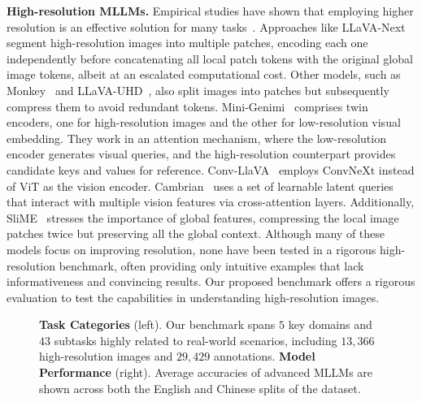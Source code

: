 \textbf{High-resolution MLLMs.} 
Empirical studies have shown that employing higher resolution is an effective solution for many tasks~\citep{bai2023qwen,liu2023improved,li2023monkey,mckinzie2024mm1}. Approaches like LLaVA-Next~\citep{liu2024llavanext} segment high-resolution images into multiple patches, encoding each one independently before concatenating all local patch tokens with the original global image tokens, albeit at an escalated computational cost. Other models, such as Monkey~\citep{li2023monkey} and LLaVA-UHD~\citep{xu2024llava-uhd}, also split images into patches but subsequently compress them to avoid redundant tokens. Mini-Genimi~\citep{li2024mini} comprises twin encoders, one for high-resolution images and the other for low-resolution visual embedding. They work in an attention mechanism, where the low-resolution encoder generates visual queries, and the high-resolution counterpart provides candidate keys and values for reference. Conv-LlaVA~\citep{ge2024convllava} employs ConvNeXt instead of ViT as the vision encoder. Cambrian~\citep{tong2024cambrian} uses a set of learnable latent queries that interact with multiple vision features via cross-attention layers. Additionally, SliME~\citep{zhang2024beyond} stresses the importance of global features, compressing the local image patches twice but preserving all the global context. Although many of these models focus on improving resolution, none have been tested in a rigorous high-resolution benchmark, often providing only intuitive examples that lack informativeness and convincing results. Our proposed benchmark offers a rigorous evaluation to test the capabilities in understanding high-resolution images.

\begin{figure*}[t]
\centering
{}%
%
\centering
\vspace{-0.2cm}
\caption{\textbf{Task Categories} (left). Our benchmark spans $5$ key domains and $43$ subtasks highly related to real-world scenarios, including $13,366$ high-resolution images and $29,429$ annotations. \textbf{Model Performance} (right). Average accuracies of advanced MLLMs are shown across both the English and Chinese splits of the dataset.}
\label{fig:teaser}
\end{figure*}